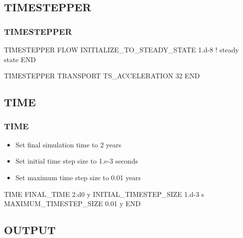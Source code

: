 \documentclass{beamer}
\newcommand\bluecomment[1]{{{\color{blue} #1}}}
\begin{document}
\subsection{TIMESTEPPER}

\begin{frame}[fragile]\frametitle{\bf TIMESTEPPER}

\begin{semiverbatim}
TIMESTEPPER FLOW            
  INITIALIZE_TO_STEADY_STATE 1.d-8 \bluecomment{! steady state}
END

TIMESTEPPER TRANSPORT
  TS_ACCELERATION 32
END
\end{semiverbatim}

\end{frame}
\subsection{TIME}

\begin{frame}[fragile]\frametitle{\bf TIME}

\begin{itemize}
\item Set final simulation time to 2 years
\item Set initial time step size to 1.e-3 seconds
\item Set maximum time step size to 0.01 years
\end{itemize}

\begin{semiverbatim}

TIME
  FINAL_TIME 2.d0 y
  INITIAL_TIMESTEP_SIZE 1.d-3 s
  MAXIMUM_TIMESTEP_SIZE 0.01 y
END
\end{semiverbatim}

\end{frame}

\subsection{OUTPUT}
\end{document}
